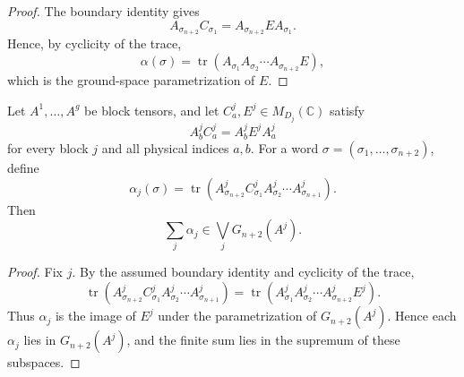 \begin{proof}
    \leanok
    The boundary identity gives
    \[
        A_{\sigma_{n+2}} C_{\sigma_1}
        =
        A_{\sigma_{n+2}}EA_{\sigma_1}.
    \]
    Hence, by cyclicity of the trace,
    \[
        \alpha(\sigma)
        =
        \operatorname{tr}\!\left(
        A_{\sigma_1}A_{\sigma_2}\cdots A_{\sigma_{n+2}}E
        \right),
    \]
    which is the ground-space parametrization of \(E\).
\end{proof}

\begin{lemma}
    \label{lem:left_boundary_summands_mem_block_ground_spaces}
    \leanok
    Let \(A^1,\ldots,A^g\) be block tensors, and let
    \(C^j_a,E^j\in M_{D_j}(\mathbb C)\) satisfy
    \[
        A^j_b C^j_a=A^j_bE^jA^j_a
    \]
    for every block \(j\) and all physical indices \(a,b\).
    For a word \(\sigma=(\sigma_1,\ldots,\sigma_{n+2})\), define
    \[
        \alpha_j(\sigma)
        =
        \operatorname{tr}\!\left(
        A^j_{\sigma_{n+2}} C^j_{\sigma_1}
        A^j_{\sigma_2}\cdots A^j_{\sigma_{n+1}}
        \right).
    \]
    Then
    \[
        \sum_j \alpha_j
        \in
        \bigvee_j G_{n+2}(A^j).
    \]
\end{lemma}

\begin{proof}
    \leanok
    Fix \(j\).  By the assumed boundary identity and cyclicity of the
    trace,
    \[
        \operatorname{tr}\!\left(
        A^j_{\sigma_{n+2}} C^j_{\sigma_1}
        A^j_{\sigma_2}\cdots A^j_{\sigma_{n+1}}
        \right)
        =
        \operatorname{tr}\!\left(
        A^j_{\sigma_1}A^j_{\sigma_2}\cdots
        A^j_{\sigma_{n+2}}E^j
        \right).
    \]
    Thus \(\alpha_j\) is the image of \(E^j\) under the parametrization
    of \(G_{n+2}(A^j)\).  Hence each \(\alpha_j\) lies in
    \(G_{n+2}(A^j)\), and the finite sum lies in the supremum of these
    subspaces.
\end{proof}

